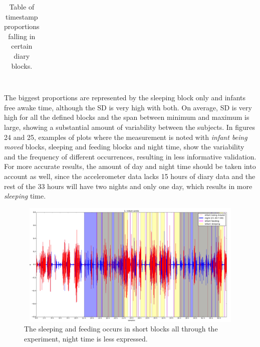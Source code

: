 \documentclass{article}
\begin{document}
{\begin{table}[h]
\begin{tabular}{|p{0.5cm}|p{1cm}|p{1cm}|p{1cm}|p{1.5cm}|p{1.5cm}|p{1.5cm}|p{1.2cm}|p{1cm}|p{1cm}|p{1cm}|p{1cm}|p{1cm}|}
\end{tabular}
\caption{Table of timestamp proportions falling in certain diary blocks. }
\end{table}
\\
The biggest proportions are represented by the sleeping block only and infants free awake time, although the SD is very high with both. On average, SD is very high for all the defined blocks and the span between minimum and maximum is large, showing a substantial amount of variability between the subjects. In figures 24 and 25, examples of plots where the measurement is noted with \textit{infant being moved} blocks, sleeping and feeding blocks and night time, show the variability and the frequency of different occurrences, resulting in less informative validation. For more accurate results, the amount of day and night time should be taken into account as well, since the accelerometer data lacks 15 hours of diary data and the rest of the 33 hours will have two nights and only one day, which results in more \textit{sleeping} time.
\begin{figure}[h]
\includegraphics[width=15cm, height=6cm]{1moved.png}
\caption{The sleeping and feeding occurs in short blocks all through the experiment, night time is less expressed. }
\end{figure}

}
\end{document}
